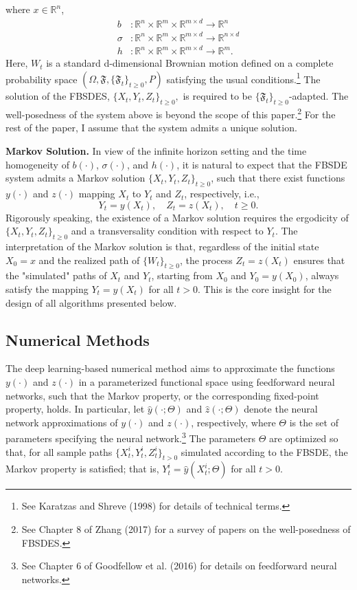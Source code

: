 \documentclass{article}
\begin{document}
where $x\in\mathbb{R}^{n}$,
\begin{align*}
b&:\mathbb{R}^{n}\times\mathbb{R}^{m}\times\mathbb{R}^{m\times d}\rightarrow\mathbb{R}^{n} \\
\sigma&:\mathbb{R}^{n}\times\mathbb{R}^{m}\times\mathbb{R}^{m\times d}\rightarrow\mathbb{R}^{n\times d} \\
h&:\mathbb{R}^{n}\times\mathbb{R}^{m}\times\mathbb{R}^{m\times d}\rightarrow\mathbb{R}^{m}.
\end{align*}
Here, $W_{t}$ is a standard d-dimensional Brownian motion defined on a complete probability space $(\Omega,\mathfrak{F},\{\mathfrak{F}_{t}\}_{t\ge0},P)$ satisfying the usual conditions.\footnote{See Karatzas and Shreve (1998) for details of technical terms.} The solution of the FBSDES, $\{X_{t},Y_{t},Z_{t}\}_{t\ge0},$ is required to be $\{\mathfrak{F}_{t}\}_{t\ge0}$-adapted. The well-posedness of the system above is beyond the scope of this paper.\footnote{See Chapter 8 of Zhang (2017) for a survey of papers on the well-posedness of FBSDES.} For the rest of the paper, I assume that the system admits a unique solution.

\textbf{Markov Solution.} In view of the infinite horizon setting and the time homogeneity of $b(\cdot)$, $\sigma(\cdot)$, and $h(\cdot)$, it is natural to expect that the FBSDE system admits a Markov solution $\{X_{t},Y_{t},Z_{t}\}_{t\ge0}$, such that there exist functions $y(\cdot)$ and $z(\cdot)$ mapping $X_{t}$ to $Y_{t}$ and $Z_{t}$, respectively, i.e.,
\[
Y_{t}=y(X_{t}), \quad Z_{t}=z(X_{t}), \quad t\ge0.
\]
Rigorously speaking, the existence of a Markov solution requires the ergodicity of $\{X_{t},Y_{t},Z_{t}\}_{t\ge0}$ and a transversality condition with respect to $Y_{t}$. The interpretation of the Markov solution is that, regardless of the initial state $X_{0}=x$ and the realized path of $\{W_{t}\}_{t\ge0}$, the process $Z_{t}=z(X_{t})$ ensures that the "simulated" paths of $X_{t}$ and $Y_{t}$, starting from $X_{0}$ and $Y_{0}=y(X_{0})$, always satisfy the mapping $Y_{t}=y(X_{t})$ for all $t>0$. This is the core insight for the design of all algorithms presented below.

\subsection{Numerical Methods}

The deep learning-based numerical method aims to approximate the functions $y(\cdot)$ and $z(\cdot)$ in a parameterized functional space using feedforward neural networks, such that the Markov property, or the corresponding fixed-point property, holds. In particular, let $\hat{y}(\cdot;\Theta)$ and $\hat{z}(\cdot;\Theta)$ denote the neural network approximations of $y(\cdot)$ and $z(\cdot)$, respectively, where $\Theta$ is the set of parameters specifying the neural network.\footnote{See Chapter 6 of Goodfellow et al. (2016) for details on feedforward neural networks.} The parameters $\Theta$ are optimized so that, for all sample paths $\{X_{t}^{i},Y_{t}^{i},Z_{t}^{i}\}_{t>0}$ simulated according to the FBSDE, the Markov property is satisfied; that is, $Y_{t}^{i}=\hat{y}(X_{t}^{i};\Theta)$ for all $t>0$.
\end{document}
